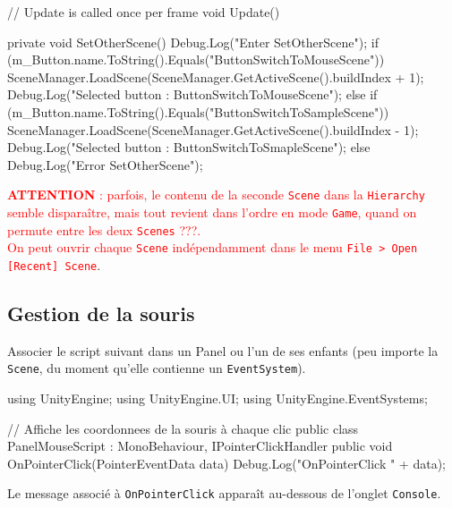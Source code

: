 \documentclass[a4paper,10pt]{article}
\newenvironment{solution}%
{\begin{tcolorbox}[breakable,colback=red!5!white,colframe=red!75!black,title=Solution]}%
{\end{tcolorbox}}
\newenvironment{boxcode}%
{\begin{tcolorbox}[breakable,colback=gray!5!white,colframe=black]}%
	{\end{tcolorbox}}
\begin{document}
\begin{solution}
\begin{boxcode}
\begin{csharpsansbord}
{	// Update is called once per frame
	void Update() {	}
	
	private void SetOtherScene() {
		Debug.Log("Enter SetOtherScene");
		if (m_Button.name.ToString().Equals("ButtonSwitchToMouseScene")) {
			SceneManager.LoadScene(SceneManager.GetActiveScene().buildIndex + 1);
			Debug.Log("Selected button : ButtonSwitchToMouseScene");
		}
		else if (m_Button.name.ToString().Equals("ButtonSwitchToSampleScene")) {
			SceneManager.LoadScene(SceneManager.GetActiveScene().buildIndex - 1);
			Debug.Log("Selected button : ButtonSwitchToSmapleScene");
		}
		else {
			Debug.Log("Error SetOtherScene");
		}
	}
}

\end{csharpsansbord}
\end{boxcode}		

\textcolor{red}{\textbf{ATTENTION} : parfois, le contenu de la seconde \texttt{Scene} dans la \texttt{Hierarchy} semble disparaître, mais tout revient dans l'ordre en mode \texttt{Game}, quand on permute entre les deux \texttt{Scenes} ???. \\
On peut ouvrir chaque \texttt{Scene} indépendamment dans le menu \texttt{File > Open  [Recent] Scene}}.



\subsection{Gestion de la souris}
Associer le script  suivant dans un Panel ou l'un de ses enfants (peu importe la \texttt{Scene}, du moment qu'elle contienne un \texttt{EventSystem}).

\begin{boxcode}
\begin{csharpsansbord}
using UnityEngine;
using UnityEngine.UI;
using UnityEngine.EventSystems;

// Affiche les coordonnees de la souris à chaque clic
public class PanelMouseScript : MonoBehaviour, IPointerClickHandler
{
	public void OnPointerClick(PointerEventData data)
	{
		Debug.Log("OnPointerClick " + data);
	}
}
\end{csharpsansbord}
\end{boxcode}

Le message associé à \texttt{OnPointerClick} apparaît au-dessous de l'onglet \texttt{Console}.
\end{solution}	
\fi 
\end{document}
